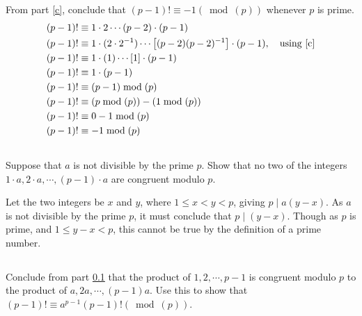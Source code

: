 \documentclass{article}
\begin{document}
From part \ref{c}, conclude that $ (p - 1)! \equiv -1(\bmod(p)) $ whenever $ p $ is prime.
\begin{align*}
	(p - 1)! & \equiv 1 \cdot 2 \cdots (p - 2) \cdot (p - 1)                                                                       \\
	(p - 1)! & \equiv 1 \cdot (2 \cdot 2^{-1}) \cdots \left[ (p - 2)(p - 2)^{-1} \right] \cdot (p - 1), \quad \text{using \ref{c}} \\
	(p - 1)! & \equiv 1 \cdot (1) \cdots \left[ 1 \right] \cdot (p - 1)                                                            \\
	(p - 1)! & \equiv 1 \cdot (p - 1)                                                                                              \\
	(p - 1)! & \equiv (p - 1)\bmod(p)                                                                                              \\
	(p - 1)! & \equiv (p \bmod(p)) - (1 \bmod(p))                                                                                  \\
	(p - 1)! & \equiv 0 - 1 \bmod(p)                                                                                               \\
	(p - 1)! & \equiv -1 \bmod(p)
\end{align*}

\subsection{} \label{e}

Suppose that $ a $ is not divisible by the prime $ p $. Show that no two of the integers $ 1 \cdot a, 2 \cdot a, \cdots, (p - 1) \cdot a $ are congruent modulo $ p $.

Let the two integers be $ x $ and $ y $, where $ 1 \leq x < y < p $, giving $ p \mid a(y - x) $. As $ a $ is not divisible by the prime $ p $, it must conclude that $ p \mid (y - x) $. Though as $ p $ is prime, and $ 1 \leq y - x < p $, this cannot be true by the definition of a prime number.

\subsection{} \label{f}

Conclude from part \ref{e} that the product of $ 1, 2, \cdots, p - 1 $ is congruent modulo $ p $ to the product of $ a, 2a, \cdots, (p - 1)a $. Use this to show that $ (p - 1)! \equiv a^{p - 1}(p - 1)!(\bmod(p)) $.
\end{document}
